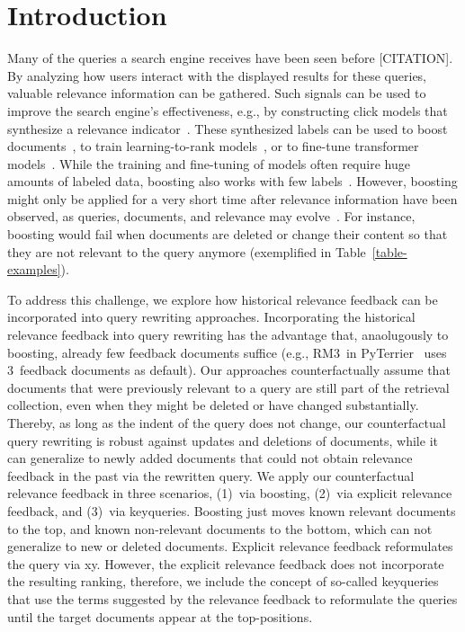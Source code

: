 \section{Introduction}

Many of the queries a search engine receives have been seen before {\color{red}[CITATION]}. By analyzing how users interact with the displayed results for these queries, valuable relevance information can be gathered. Such signals can be used to improve the search engine's effectiveness, e.g., by constructing click models that synthesize a relevance indicator~\cite{chuklin:2015}. These synthesized labels can be used to boost documents~\cite{keller:2024b}, to train learning-to-rank models~\cite{liu:2011}, or to fine-tune transformer models~\cite{lin:2021}. While the training and fine-tuning of models often require huge amounts of labeled data, boosting also works with few labels~\cite{keller:2024b}. However, boosting might only be applied for a very short time after relevance information have been observed, as queries, documents, and relevance may evolve~\cite{keller:2024}. For instance, boosting would fail when documents are deleted or change their content so that they are not relevant to the query anymore (exemplified in Table~\ref{table-examples}).




To address this challenge, we explore how historical relevance feedback can be incorporated into query rewriting approaches. Incorporating the historical relevance feedback into query rewriting has the advantage that, anaolugously to boosting, already few feedback documents suffice (e.g., RM3~in PyTerrier~\cite{macdonald:2020} uses 3~feedback documents as default). Our approaches counterfactually assume that documents that were previously relevant to a query are still part of the retrieval collection, even when they might be deleted or have changed substantially. Thereby, as long as the indent of the query does not change, our counterfactual query rewriting is robust against updates and deletions of documents, while it can generalize to newly added documents that could not obtain relevance feedback in the past via the rewritten query. We apply our counterfactual relevance feedback in three scenarios, (1)~via boosting, (2)~via explicit relevance feedback, and (3)~via keyqueries. Boosting just moves known relevant documents to the top, and known non-relevant documents to the bottom, which can not generalize to new or deleted documents. Explicit relevance feedback reformulates the query via xy. However, the explicit relevance feedback does not incorporate the resulting ranking, therefore, we include the concept of so-called keyqueries~\cite{gollub:2013a} that use the terms suggested by the relevance feedback to reformulate the queries until the target documents appear at the top-positions.

